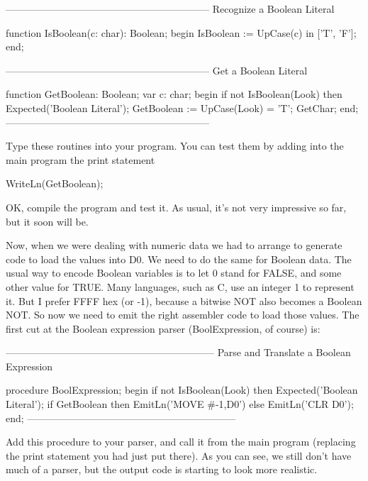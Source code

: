 \documentclass[float=false, crop=false]{standalone}
\begin{document}
\begin{code}
{--------------------------------------------------------------}
{ Recognize a Boolean Literal }

function IsBoolean(c: char): Boolean;
begin
   IsBoolean := UpCase(c) in ['T', 'F'];
end;


{--------------------------------------------------------------}
{ Get a Boolean Literal }

function GetBoolean: Boolean;
var c: char;
begin
   if not IsBoolean(Look) then Expected('Boolean Literal');
   GetBoolean := UpCase(Look) = 'T';
   GetChar;
end;
{--------------------------------------------------------------}
\end{code}

Type these routines into your program. You can test them by adding into the main
program the print statement

\begin{code}
   WriteLn(GetBoolean);
\end{code}

OK, compile the program and test it. As usual, it's not very impressive so far,
but it soon will be.

Now, when we were dealing with numeric data we had to arrange to generate code
to load the values into D0. We need to do the same for Boolean data. The usual
way to encode Boolean variables is to let 0 stand for FALSE, and some other
value for TRUE. Many languages, such as C, use an integer 1 to represent it. But
I prefer FFFF hex (or -1), because a bitwise NOT also becomes a Boolean NOT. So
now we need to emit the right assembler code to load those values. The first cut
at the Boolean expression parser (BoolExpression, of course) is:

\begin{code}
{---------------------------------------------------------------}
{ Parse and Translate a Boolean Expression }

procedure BoolExpression;
begin
   if not IsBoolean(Look) then Expected('Boolean Literal');
   if GetBoolean then
      EmitLn('MOVE #-1,D0')
   else
      EmitLn('CLR D0');
end;
{---------------------------------------------------------------}
\end{code}

Add this procedure to your parser, and call it from the main program (replacing
the print statement you had just put there). As you can see, we still don't have
much of a parser, but the output code is starting to look more realistic.
\end{document}
